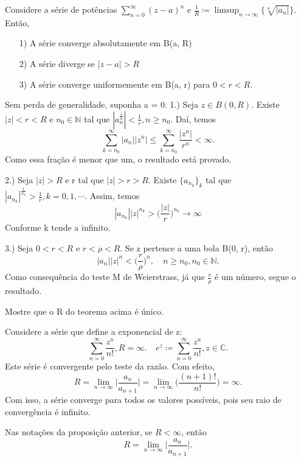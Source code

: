 \documentclass[complex.tex]{subfiles}
\begin{document}
\begin{theorem*}
	Considere a série de potências $\sum\limits_{n=0}^{\infty}(z-a)^n$ e $\frac{1}{R}\coloneqq \limsup_{n\to\infty}\{\sqrt[n]{|a_n|}\}$.
	Então,
	\begin{itemize}
		\item[1)] A série converge absolutamente em B(a, R)
		\item[2)] A série diverge se $|z-a| > R$
		\item[3)] A série converge uniformemente em B(a, r) para $0 < r < R.$
	\end{itemize}
\end{theorem*}
\begin{proof*}
	Sem perda de generalidade, suponha a = 0.
	1.) Seja $z\in{B(0, R)}.$ Existe $|z| < r < R$ e $n_0\in\mathbb{N}$ tal que $|a_n^{\frac{1}{n}}| < \frac{1}{r},
		n\geq{n_0}.$ Daí, temos
	$$
		\sum_{k=n_0}^{\infty}|a_n||z^n|\leq \sum_{k=n_0}^{\infty}\frac{|z^n|}{r^n} < \infty.
	$$
	Como essa fração é menor que um, o resultado está provado.

	2.) Seja $|z| > R$ e r tal que $|z|> r > R$. Existe $\{a_{n_k}\}_k$ tal que $|a_{n_k}|^{\frac{1}{n_k}} > \frac{1}{r},
		k = 0, 1, \cdots.$ Assim, temos
	$$
		|a_{n_k}||z|^{n_k} > \biggl(\frac{|z|}{r}\biggr)^{n_k}\to\infty
	$$
	Conforme k tende a infinito.

	3.) Seja $0 < r < R \text{ e } r < \rho < R.$ Se z pertence a uma bola B(0, r), então
	$$
		|a_n||z|^n < \biggl(\frac{r}{\rho}\biggr)^n, \quad n\geq{n_0}, n_0\in\mathbb{N}.
	$$
	Como consequência do teste M de Weierstrass, já que $\frac{r}{\rho}$ é um número, segue
	o resultado.
	\qedsymbol
\end{proof*}
\begin{exer*}
	Mostre que o R do teorema acima é único.
\end{exer*}
\begin{example}
	Considere a série que define a exponencial de z:
	$$
		\sum_{n=0}^{\infty}\frac{z^n}{n!}, R = \infty.\quad e^z\coloneqq \sum_{n=0}^{\infty}\frac{z^n}{n!}, z\in\mathbb{C}.
	$$
	Este série é convergente pelo teste da razão. Com efeito,
	$$
		R = \lim_{n\to\infty}\biggl|\frac{a_n}{a_{n+1}}\biggr| = \lim_{n\to\infty}\biggl(\frac{(n+1)!}{n!}\biggr) = \infty.
	$$
	Com isso, a série converge para todos os valores possíveis, pois seu raio de convergência
	é infinito.
\end{example}
\begin{prop*}
	Nas notações da proposição anterior, se $R < \infty$, então
	$$
		R = \lim_{n\to\infty}\biggl|\frac{a_n}{a_{n+1}}\biggr|.
	$$
\end{prop*}
\end{document}

